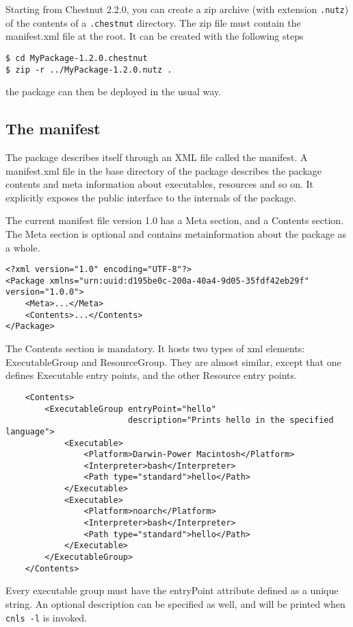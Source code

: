 Starting from Chestnut 2.2.0, you can create a zip archive (with extension
\verb+.nutz+) of the contents of a \verb+.chestnut+ directory.  The zip file
must contain the manifest.xml file at the root. It can be created with the
following steps
\begin{verbatim}
$ cd MyPackage-1.2.0.chestnut
$ zip -r ../MyPackage-1.2.0.nutz .
\end{verbatim}
the package can then be deployed in the usual way.


\subsection{The manifest}
The package describes itself through an XML file called the manifest.
A manifest.xml file in the base directory of the package describes the package
contents and meta information about executables, resources and so on. It
explicitly exposes the public interface to the internals of the package.

The current manifest file version 1.0 has a Meta section, and a Contents section. 
The Meta section is optional and contains metainformation about the package as a whole.

\begin{verbatim}
<?xml version="1.0" encoding="UTF-8"?>
<Package xmlns="urn:uuid:d195be0c-200a-40a4-9d05-35fdf42eb29f" version="1.0.0">
    <Meta>...</Meta>
    <Contents>...</Contents>
</Package>
\end{verbatim}

The Contents section is mandatory. It hosts two types of xml elements:
ExecutableGroup and ResourceGroup.  They are almost similar, except that one
defines Executable entry points, and the other Resource entry points.

\begin{verbatim}
    <Contents>
        <ExecutableGroup entryPoint="hello" 
                         description="Prints hello in the specified language">
            <Executable>
                <Platform>Darwin-Power Macintosh</Platform>
                <Interpreter>bash</Interpreter>
                <Path type="standard">hello</Path>
            </Executable>
            <Executable>
                <Platform>noarch</Platform>
                <Interpreter>bash</Interpreter>
                <Path type="standard">hello</Path>
            </Executable>
        </ExecutableGroup>
    </Contents>
\end{verbatim}
Every executable group must have the entryPoint attribute defined as a unique
string.  An optional description can be specified as well, and will be printed
when \verb+cnls -l+ is invoked. 


